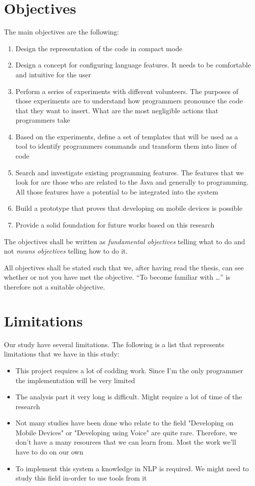 \section{Objectives}
The main objectives are the following:
\begin{enumerate}
	\item Design the representation of the code in compact mode
	\item Design a concept for configuring language features. It needs to be comfortable and intuitive for the user
	\item Perform a series of experiments with different volunteers. The purposes of those experiments are to understand how programmers pronounce the code that they want to insert. What are the most negligible actions that programmers take
	\item Based on the experiments, define a set of templates that will be used as a tool to identify programmers commands and transform them into lines of code
	\item Search and investigate existing programming features. The features that we look for are those who are related to the Java and generally to programming. All those features have a potential to be integrated into the system
	\item Build a prototype that proves that developing on mobile devices is possible
	\item Provide a solid foundation for future works based on this research
\end{enumerate}

The objectives shall be written as \emph{fundamental objectives} telling what to do and not \emph{means objectives} telling how to do it.

All objectives shall be stated such that we, after having read the thesis, can see whether or not you have met the objective. ``To become familiar with \ldots'' is therefore not a suitable objective.

\section{Limitations}
Our study have several limitations. The following is a list that represents limitations that we have in this study: 
\begin{itemize}
	\item This project requires a lot of codding work. Since I'm the only programmer the implementation will be very limited
	\item The analysis part it very long is difficult. Might require a lot of time of the research
	\item Not many studies have been done who relate to the field "Developing on Mobile Devices" or "Developing using Voice" are quite rare. Therefore, we don't have a many resources that we can learn from. Most the work we'll have to do on our own
	\item To implement this system a knowledge in NLP is required. We might need to study this field in-order to use tools from it
\end{itemize}

